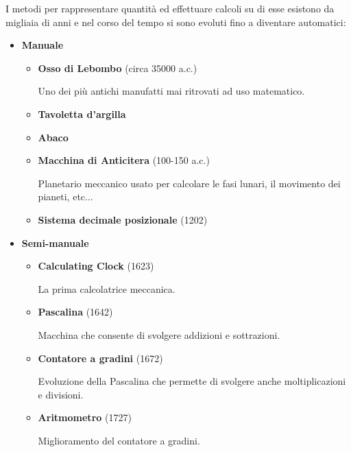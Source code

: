 \documentclass{article}
\begin{document}
\noindent I metodi per rappresentare quantità ed effettuare calcoli su di esse esistono da migliaia di anni e nel corso del tempo si sono evoluti fino a diventare automatici: 
\begin{itemize}
    
    \item \textbf{Manuale} 
        \begin{itemize}
            \item \textbf{Osso di Lebombo} (circa 35000 a.c.)

                Uno dei più antichi manufatti mai ritrovati ad uso matematico.
            
            \item \textbf{Tavoletta d'argilla} 

            \item \textbf{Abaco} 

            \item \textbf{Macchina di Anticitera} (100-150 a.c.)

                Planetario meccanico usato per calcolare le fasi lunari, il movimento dei pianeti, etc$\ldots$

            \item \textbf{Sistema decimale posizionale} (1202)\newline
            
        \end{itemize}

    \item \textbf{Semi-manuale}
        \begin{itemize}
            \item \textbf{Calculating Clock} (1623)

                La prima calcolatrice meccanica.

            \item \textbf{Pascalina} (1642)

                Macchina che consente di svolgere addizioni e sottrazioni.

            \item \textbf{Contatore a gradini} (1672)

                Evoluzione della Pascalina che permette di svolgere anche moltiplicazioni e divisioni.

            \item \textbf{Aritmometro} (1727)

                Miglioramento del contatore a gradini.


\end{itemize}
\end{itemize}
\end{document}
